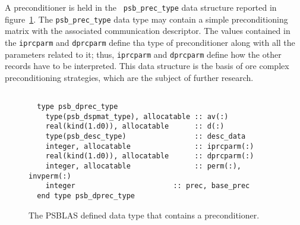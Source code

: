  A preconditioner is held in the \hypertarget{precdata}{{\tt
    psb\_prec\_type}} data structure reported in 
figure~\ref{fig:prectype}. The \verb|psb_prec_type| 
data type may contain a simple preconditioning matrix with the
associated communication descriptor.%
The values contained in
the \verb|iprcparm| and \verb|dprcparm| define tha type of
preconditioner along with all the parameters related to it; thus,
\verb|iprcparm| and \verb|dprcparm| define how the other records have
to be interpreted. This data structure is the basis of ore complex
preconditioning strategies, which are the subject of further
research. 
\begin{figure}[h!]
  \small
  \begin{Sbox}
    \begin{minipage}[tl]{0.9\textwidth}
\begin{verbatim}

  type psb_dprec_type
    type(psb_dspmat_type), allocatable :: av(:) 
    real(kind(1.d0)), allocatable      :: d(:)  
    type(psb_desc_type)                :: desc_data 
    integer, allocatable               :: iprcparm(:) 
    real(kind(1.d0)), allocatable      :: dprcparm(:) 
    integer, allocatable               :: perm(:),  invperm(:) 
    integer                       :: prec, base_prec
  end type psb_dprec_type

\end{verbatim}
    \end{minipage}
  \end{Sbox}
  \setlength{\fboxsep}{8pt}
  \begin{center}
    \fbox{\TheSbox}
  \end{center}
  \caption{\label{fig:prectype}The PSBLAS defined data type that contains a preconditioner.}
\end{figure}

